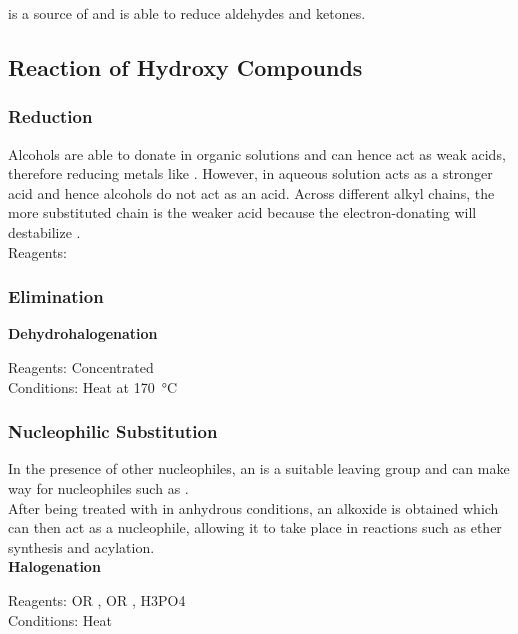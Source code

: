 \documentclass[../main]{subfiles}
\begin{document}
	 is a source of  and is able to reduce aldehydes and ketones. 

	\subsection{Reaction of Hydroxy Compounds}

	\subsubsection{Reduction}

	Alcohols are able to donate  in organic solutions and can hence act as weak acids, therefore reducing metals like . However, in aqueous solution  acts as a stronger acid and hence alcohols do not act as an acid. Across different alkyl chains, the more substituted chain is the weaker acid because the electron-donating  will destabilize . \\

	Reagents:  \\


	\subsubsection{Elimination}

	\noindent \textbf{Dehydrohalogenation}

	Reagents: Concentrated  \\
	Conditions: Heat at \SI{170}{\celsius}\\

	\subsubsection{Nucleophilic Substitution}

	In the presence of other nucleophiles, an  is a suitable leaving group and can make way for nucleophiles such as . \\

	After being treated with  in anhydrous conditions, an alkoxide  is obtained which can then act as a nucleophile, allowing it to take place in reactions such as ether synthesis and acylation. \\

	\noindent \textbf{Halogenation}

	Reagents:  OR ,  OR , {H3PO4} \\
	Conditions:  Heat \\
\end{document}
